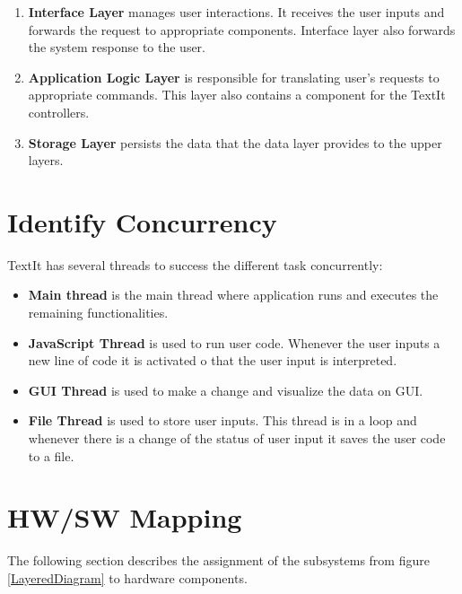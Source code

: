 
\begin{enumerate}
\item \textbf{Interface Layer} manages user interactions. It receives the user inputs and forwards the request to appropriate components. Interface layer also forwards the system response to the user.

\item \textbf{Application Logic Layer} is responsible for translating user's requests to appropriate commands. This layer also contains a component for the TextIt controllers.

\item \textbf{Storage Layer} persists the data that the data layer provides to the upper layers.

\end{enumerate}


\section{Identify Concurrency}
TextIt has several threads to success the different task concurrently:
\begin{itemize}
\item \textbf{Main thread} is the main thread where application runs and executes the remaining functionalities. 
\item \textbf{JavaScript Thread} is used to run user code. Whenever the user inputs a new line of code it is activated o that the user input is interpreted. 
\item \textbf{GUI Thread} is used to make a change and visualize the data on GUI.
\item \textbf{File Thread} is used to store user inputs. This thread is in a loop and whenever there is a change of the status of user input it saves the user code to a file.
\end{itemize}


\section{HW/SW Mapping}
The following section describes the assignment of the subsystems from figure \ref{LayeredDiagram} to hardware components. \\

